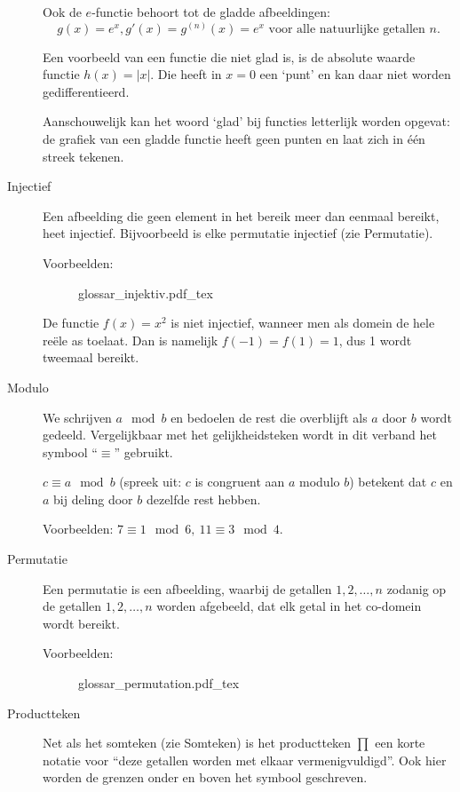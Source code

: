 \begin{description}
	Ook de $e$-functie behoort tot de gladde afbeeldingen:
	\begin{equation*}
		g(x) = e^x, g'(x) = g^{(n)}(x) = e^x \text{ voor alle natuurlijke getallen } n.
	\end{equation*}

	Een voorbeeld van een functie die niet glad is, is de absolute waarde functie $h(x) = |x|$. Die heeft in $x = 0$ een `punt' en kan daar niet worden gedifferentieerd.

	Aanschouwelijk kan het woord `glad' bij functies letterlijk wor\-den opgevat: de grafiek van een gladde functie heeft geen punten en laat zich in één streek tekenen.

	\item[Injectief] Een afbeelding die geen element in het bereik meer dan eenmaal bereikt, heet injectief. Bijvoorbeeld is elke permutatie injectief (zie Permutatie).

	Voorbeelden:
	\begin{figure}
		\def\svgwidth{200pt}
		{glossar_injektiv.pdf_tex}
	\end{figure}

	De functie $f(x) = x^2$ is niet injectief, wanneer men als domein de hele reële as toelaat. Dan is namelijk $f(-1) = f(1) = 1$, dus 1 wordt tweemaal bereikt.

	\item[Modulo] We schrijven $a \mod b$ en bedoelen de rest die overblijft als $a$ door $b$ wordt gedeeld. Vergelijkbaar met het gelijkheidsteken wordt in dit verband het symbool ``$\equiv$'' gebruikt.

	$c \equiv a \mod b$ (spreek uit: $c$ is congruent aan $a$ modulo $b$) be\-tekent dat $c$ en $a$ bij deling door $b$ dezelfde rest hebben.

	Voorbeelden: $7 \equiv 1 \mod 6,\ 11 \equiv 3 \mod 4$.

\clearpage

	\item[Permutatie] Een permutatie is een afbeelding, waarbij de getallen $1,2,\dotsc,n$ zodanig op de getallen $1,2,\dotsc,n$ worden afgebeeld, dat elk getal in het co-domein wordt bereikt.

	Voorbeelden:
	\begin{figure}
		\def\svgwidth{200pt}
		{glossar_permutation.pdf_tex}
	\end{figure}

	\item[Productteken] Net als het somteken (zie Somteken) is het product\-teken $\prod$ een korte notatie voor ``deze getallen worden met elkaar vermenigvuldigd''. Ook hier worden de grenzen onder en boven het symbool geschreven.


\end{description}
